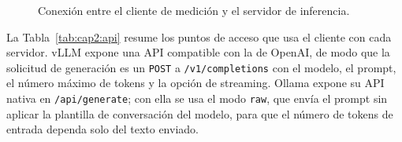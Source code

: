 \begin{figure}[htbp]
  \centering
  \small
  \setlength{\fboxsep}{6pt}
  \caption{Conexión entre el cliente de medición y el servidor de inferencia.}
  \label{fig:cap2:conexion}
\end{figure}

La Tabla~\ref{tab:cap2:api} resume los puntos de acceso que usa el cliente con cada servidor. vLLM expone una API compatible con la de OpenAI, de modo que la solicitud de generación es un \texttt{POST} a \texttt{/v1/completions} con el modelo, el prompt, el número máximo de tokens y la opción de streaming. Ollama expone su API nativa en \texttt{/api/generate}; con ella se usa el modo \texttt{raw}, que envía el prompt sin aplicar la plantilla de conversación del modelo, para que el número de tokens de entrada dependa solo del texto enviado.

